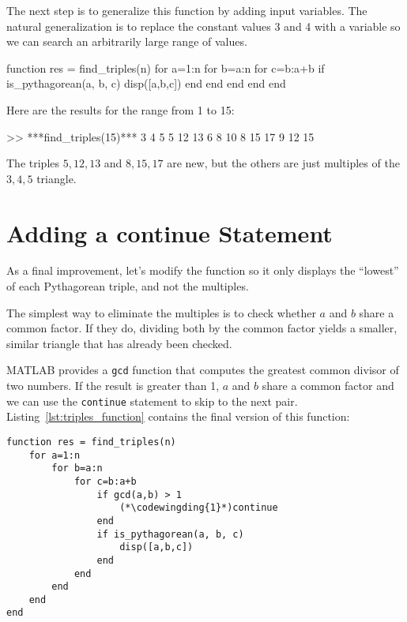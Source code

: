 
The next step is to generalize this function by adding input
variables.  The natural generalization is to replace the constant
values 3 and 4 with a variable so we can search an arbitrarily large
range of values.

\begin{code}
function res = find_triples(n)
    for a=1:n
        for b=a:n
            for c=b:a+b
                if is_pythagorean(a, b, c)
                    disp([a,b,c])
                end
            end
        end
    end
end
\end{code}

Here are the results for the range from 1 to 15:

\begin{code}
>> ***find_triples(15)***
     3     4     5
     5    12    13
     6     8    10
     8    15    17
     9    12    15
\end{code}

The triples $5,12,13$ and $8,15,17$ are new, but the others are just multiples of the $3,4,5$ triangle.

\section{Adding a continue Statement}


As a final improvement, let's modify the function so it only
displays the ``lowest'' of each Pythagorean triple, and not the
multiples.

The simplest way to eliminate the multiples is to check whether
$a$ and $b$ share a common factor.  If they do, dividing both
by the common factor yields a smaller, similar triangle that has
already been checked.


MATLAB provides a {\tt gcd} function that computes the greatest common
divisor of two numbers.  If the result is greater than 1,
$a$ and $b$ share a common factor and we can use the {\tt continue}
statement to skip to the next pair. Listing~\ref{lst:triples_function} contains the final version of this function:

\begin{lstlisting}[caption={Our final Pythagorean triples function}, label={lst:triples_function}] 
function res = find_triples(n)
    for a=1:n
        for b=a:n
            for c=b:a+b
                if gcd(a,b) > 1
	                (*\codewingding{1}*)continue
                end
                if is_pythagorean(a, b, c)
                    disp([a,b,c])
                end
            end
        end
    end
end
\end{lstlisting}

